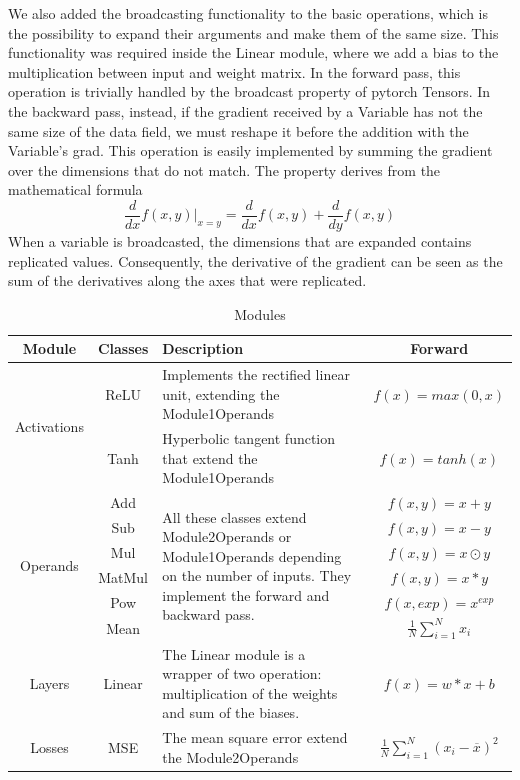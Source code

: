 \documentclass[10pt,conference,compsocconf]{IEEEtran}
\begin{document}
We also added the broadcasting functionality to the basic operations, which is the possibility to expand their arguments and make them of the same size. This functionality was required inside the Linear module, where we add a bias to the multiplication between input and weight matrix.
In the forward pass, this operation is trivially handled by the broadcast property of pytorch Tensors. In the backward pass, instead, if the gradient received by a Variable has not the same size of the data field, we must reshape it before the addition with the Variable's grad. This operation is easily implemented by summing the gradient over the dimensions that do not match. The property derives from the mathematical formula
\[\frac{d}{dx}f(x,y)|_{x=y} = \frac{d}{dx}f(x,y) + \frac{d}{dy}f(x,y)\]
When a variable is broadcasted, the dimensions that are expanded contains replicated values. Consequently, the derivative of the gradient can be seen as the sum of the derivatives along the axes that were replicated.\\
\begin{table}
\caption{Modules}
\label{tab:modules}
\begin{tabular}{ | c | c | p{10cm} | c | } 
\hline
Module & Classes & Description & Forward  \\
\hline
\multirow{2}{4em}{Activations} 
& ReLU & Implements the rectified linear unit, extending the Module1Operands & $f(x) = max(0, x)$  \\
& Tanh & Hyperbolic tangent function that extend the Module1Operands & $f(x) = tanh(x)$ \\
\hline
\multirow{6}{4em}{Operands}
& Add & \multirow{6}{30em}{All these classes extend Module2Operands or Module1Operands depending on the number of inputs. They implement the forward and backward pass. } & $f(x, y) = x + y$ \\
& Sub & & $f(x, y) = x - y$ \\ 
& Mul & & $f(x, y) = x \odot y$ \\ 
& MatMul & & $f(x, y) = x * y$ \\ 
& Pow & & $f(x, exp) = x^{exp}$ \\ 
& Mean & & $\frac{1}{N} \sum_{i=1}^N x_i$ \\
\hline
Layers & Linear & The Linear module is a wrapper of two operation: multiplication of the weights and sum of the biases. & $f(x) = w*x + b$ \\ 
\hline
Losses & MSE & The mean square error extend the Module2Operands & $\frac{1}{N} \sum_{i=1}^N (x_i - \overline{x})^2$  \\ 
\hline
\end{tabular}
\end{table}
\end{document}
